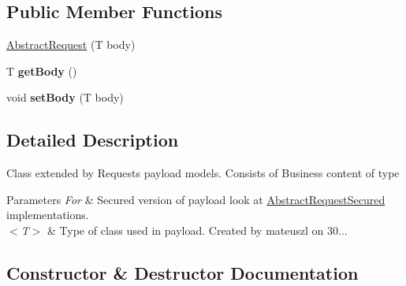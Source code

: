 \subsection*{Public Member Functions}
\begin{DoxyCompactItemize}
\item 
\hyperlink{classeu_1_1h2020_1_1symbiote_1_1core_1_1cci_1_1AbstractRequest_afa6f94ee9af11159be5dcf9379353df1}{Abstract\+Request} (T body)
\item 
\mbox{\label{classeu_1_1h2020_1_1symbiote_1_1core_1_1cci_1_1AbstractRequest_a6581da017f3a285ff607866659879b2c}} 
T {\bfseries get\+Body} ()
\item 
\mbox{\label{classeu_1_1h2020_1_1symbiote_1_1core_1_1cci_1_1AbstractRequest_a6b45a403f7d51712c01ec358b6360aff}} 
void {\bfseries set\+Body} (T body)
\end{DoxyCompactItemize}


\subsection{Detailed Description}
Class extended by Requests payload models. Consists of Business content of type
\begin{DoxyParams}{Parameters}
{\em For} & Secured version of payload look at \hyperlink{classeu_1_1h2020_1_1symbiote_1_1core_1_1cci_1_1AbstractRequestSecured}{Abstract\+Request\+Secured} implementations. \\
\hline
{\em $<$\+T$>$} & Type of class used in payload. Created by mateuszl on 30... \\
\hline
\end{DoxyParams}


\subsection{Constructor \& Destructor Documentation}
\mbox{\label{classeu_1_1h2020_1_1symbiote_1_1core_1_1cci_1_1AbstractRequest_afa6f94ee9af11159be5dcf9379353df1}} 
